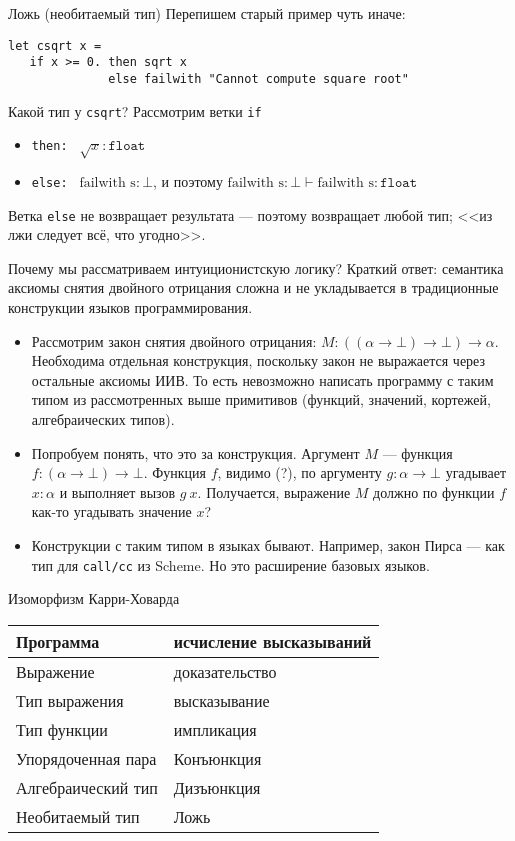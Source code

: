 \documentclass[aspectratio=169]{beamer}
\begin{document}
\begin{frame}[fragile]{Ложь (необитаемый тип)}
Перепишем старый пример чуть иначе:
\begin{verbatim}
let csqrt x =
   if x >= 0. then sqrt x
              else failwith "Cannot compute square root"
\end{verbatim}

Какой тип у \verb!csqrt!? Рассмотрим ветки \verb!if!
\begin{itemize}
\item \verb!then: ! $\sqrt x : \texttt{float}$
\item \verb!else: ! $\text{failwith s} : \bot$, и поэтому $\text{failwith s} : \bot \vdash \text{failwith s} : \texttt{float}$
\end{itemize}
Ветка \verb!else! не возвращает результата --- поэтому возвращает любой тип; <<из лжи следует всё, что угодно>>.
\end{frame}

\begin{frame}[fragile]{Почему мы рассматриваем интуиционистскую логику?}
Краткий ответ: семантика аксиомы снятия двойного отрицания сложна и не укладывается
в традиционные конструкции языков программирования.
\begin{itemize}
\item Рассмотрим закон снятия двойного отрицания: $M : ((\alpha\rightarrow\bot)\rightarrow\bot)\rightarrow\alpha$.
Необходима отдельная конструкция, поскольку закон не выражается через остальные аксиомы ИИВ.
То есть невозможно написать программу с таким типом из рассмотренных выше примитивов (функций, значений, 
кортежей, алгебраических типов).

\item Попробуем понять, что это за конструкция.
Аргумент $M$ --- функция $f: (\alpha\rightarrow\bot)\rightarrow\bot$. 
Функция $f$, видимо (?), по аргументу $g : \alpha\rightarrow\bot$ 
угадывает $x : \alpha$ и выполняет вызов $g\ x$.
Получается, выражение $M$ должно по функции $f$ как-то угадывать значение $x$?

\item Конструкции с таким типом в языках бывают. Например, закон Пирса --- как тип для \verb!call/cc! из Scheme.
Но это расширение базовых языков.
\end{itemize}
\end{frame}

\begin{frame}{Изоморфизм Карри-Ховарда}

\begin{tabular}{ll}
Программа & исчисление высказываний\\\hline
Выражение & доказательство\\
Тип выражения & высказывание\\
Тип функции & импликация\\
Упорядоченная пара & Конъюнкция\\
Алгебраический тип & Дизъюнкция\\
Необитаемый тип & Ложь
\end{tabular}

\end{frame}
\end{document}
